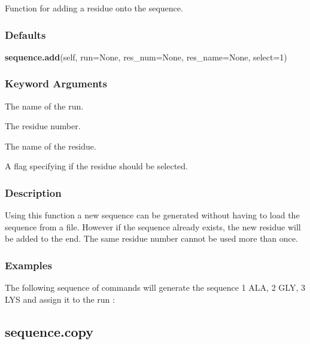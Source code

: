 Function for adding a residue onto the sequence.

\subsubsection{Defaults}

\textsf{\textbf{sequence.add}(self, run=None, res\_num=None, res\_name=None, select=1)}


\subsubsection{Keyword Arguments}


  The name of the run.

  The residue number.

  The name of the residue.

  A flag specifying if the residue should be selected.

\subsubsection{Description}

Using this function a new sequence can be generated without having to load the sequence from
a file.  However if the sequence already exists, the new residue will be added to the end.
The same residue number cannot be used more than once.


\subsubsection{Examples}

The following sequence of commands will generate the sequence 1 ALA, 2 GLY, 3 LYS and assign
it to the run 
:







\newpage

\subsection{sequence.copy}


